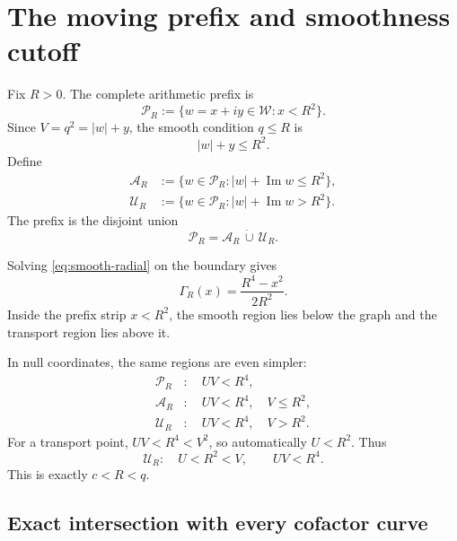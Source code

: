 \documentclass[11pt]{article}
\theoremstyle{definition}
\theoremstyle{remark}
\newcommand{\1}{\mathbf{1}}
\newcommand{\Impart}{\operatorname{Im}}
\begin{document}
\section{The moving prefix and smoothness cutoff}
\label{sec:moving-cutoff}

Fix $R>0$.  The complete arithmetic prefix is
\begin{equation}
 \mathscr P_R
 :=\{w=x+iy\in\mathscr W:x<R^2\}.
 \label{eq:prefix-region}
\end{equation}
Since $V=q^2=|w|+y$, the smooth condition $q\le R$ is
\begin{equation}
 |w|+y\le R^2.
 \label{eq:smooth-radial}
\end{equation}
Define
\begin{align}
 \mathscr A_R
 &:={\{w\in\mathscr P_R:|w|+\Impart w\le R^2\}},
 \label{eq:A-region}\\
 \mathscr U_R
 &:={\{w\in\mathscr P_R:|w|+\Impart w>R^2\}}.
 \label{eq:U-region}
\end{align}
The prefix is the disjoint union
\begin{equation}
 \mathscr P_R=\mathscr A_R\,\dot\cup\,\mathscr U_R.
 \label{eq:region-partition}
\end{equation}

Solving \cref{eq:smooth-radial} on the boundary gives
\begin{equation}
 \boxed{
 \Gamma_R(x)=\frac{R^4-x^2}{2R^2}.
 }
 \label{eq:Gamma-R}
\end{equation}
Inside the prefix strip $x<R^2$, the smooth region lies below the graph and the transport region lies above it.

In null coordinates, the same regions are even simpler:
\begin{align}
 \mathscr P_R&:\quad UV<R^4,
 \label{eq:prefix-UV}\\
 \mathscr A_R&:\quad UV<R^4,\quad V\le R^2,
 \label{eq:smooth-UV}\\
 \mathscr U_R&:\quad UV<R^4,\quad V>R^2.
 \label{eq:transport-UV}
\end{align}
For a transport point, $UV<R^4<V^2$, so automatically $U<R^2$.  Thus
\begin{equation}
 \mathscr U_R:\quad U<R^2<V,
 \qquad
 UV<R^4.
 \label{eq:transport-null-clean}
\end{equation}
This is exactly $c<R<q$.

\subsection{Exact intersection with every cofactor curve}
\end{document}
